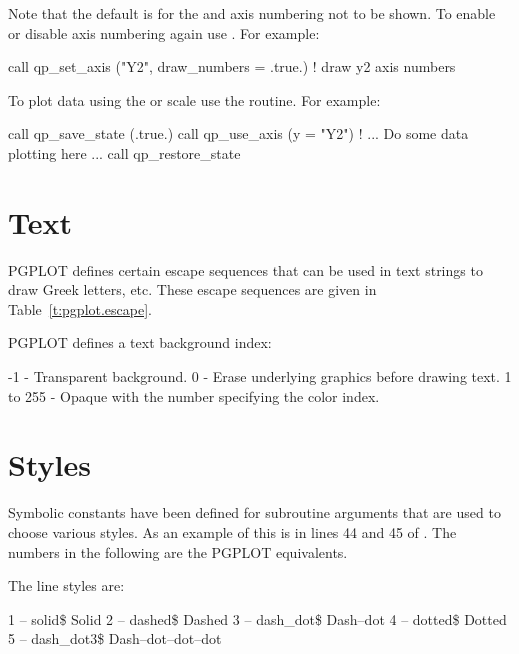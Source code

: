 Note that the default is for the  and  axis numbering
not to be shown. To enable or disable axis numbering again use
. For example:
\begin{example}
  call qp_set_axis ("Y2", draw_numbers = .true.)  ! draw y2 axis numbers
\end{example}

To plot data using the  or  scale use the
 routine. For example:
\begin{example}
  call qp_save_state (.true.)
  call qp_use_axis (y = "Y2")
  ! ... Do some data plotting here ...
  call qp_restore_state
\end{example}

\section{Text}
\label{s:text}

PGPLOT defines certain escape sequences that can be used in text strings to draw Greek letters,
etc. These escape sequences are given in Table~\ref{t:pgplot.escape}.

PGPLOT defines a text background index:
\begin{example}
         -1 - Transparent background.
          0 - Erase underlying graphics before drawing text.
   1 to 255 - Opaque with the number specifying the color index.
\end{example}

\section{Styles}
\label{s:styles}

Symbolic constants have been defined for \quickplot subroutine arguments that are used to choose
various styles. As an example of this is in lines 44 and 45 of . The numbers in
the following are the PGPLOT equivalents.

The \quickplot line styles are:
\begin{example}
    1 -- solid\$                  Solid
    2 -- dashed\$                 Dashed
    3 -- dash_dot\$               Dash--dot 
    4 -- dotted\$                 Dotted
    5 -- dash_dot3\$              Dash--dot--dot--dot        
\end{example}

